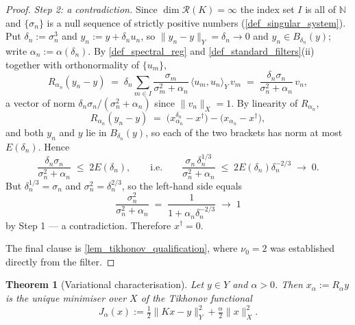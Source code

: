 \documentclass[a4paper]{report}
\theoremstyle{plain}
\newtheorem{theorem}{Theorem}[chapter]
\theoremstyle{definition}
\theoremstyle{remark}
\newcommand{\Ran}{\mathcal{R}}
\newcommand{\dg}{^{\dagger}}
\begin{document}
\begin{proof}
  \emph{Step 2: a contradiction.}  Since $\dim\Ran(K) = \infty$ the index set $I$ is all
  of $\mathbb{N}$ and $\{\sigma_n\}$ is a null sequence of strictly positive numbers
  (\cref{def_singular_system}).  Put $\delta_n := \sigma_n^{3}$ and $y_n := y +
  \delta_n u_n$, so $\|y_n - y\|_Y = \delta_n \to 0$ and $y_n \in B_{\delta_n}(y)$; write
  $\alpha_n := \alpha(\delta_n)$.  By \cref{def_spectral_reg} and
  \cref{def_standard_filters}(ii) together with orthonormality of $\{u_m\}$,
  \[
    R_{\alpha_n}(y_n - y) \;=\; \delta_n \sum_{m \in I}
      \frac{\sigma_m}{\sigma_m^{2} + \alpha_n}\,\langle u_m, u_n\rangle_Y\,v_m
      \;=\; \frac{\delta_n\sigma_n}{\sigma_n^{2} + \alpha_n}\,v_n ,
  \]
  a vector of norm $\delta_n\sigma_n/(\sigma_n^{2}+\alpha_n)$ since $\|v_n\|_X = 1$.  By
  linearity of $R_{\alpha_n}$,
  \[
    R_{\alpha_n}(y_n - y) \;=\; \bigl(x^{\delta_n}_{\alpha_n} - x\dg\bigr)
      - \bigl(x_{\alpha_n} - x\dg\bigr) ,
  \]
  and both $y_n$ and $y$ lie in $B_{\delta_n}(y)$, so each of the two brackets has norm
  at most $E(\delta_n)$.  Hence
  \[
    \frac{\delta_n\sigma_n}{\sigma_n^{2} + \alpha_n} \;\le\; 2E(\delta_n) ,
    \qquad\text{i.e.}\qquad
    \frac{\sigma_n\,\delta_n^{1/3}}{\sigma_n^{2} + \alpha_n}
      \;\le\; 2E(\delta_n)\delta_n^{-2/3} \;\longrightarrow\; 0 .
  \]
  But $\delta_n^{1/3} = \sigma_n$ and $\sigma_n^{2} = \delta_n^{2/3}$, so the left-hand
  side equals
  \[
    \frac{\sigma_n^{2}}{\sigma_n^{2}+\alpha_n}
      \;=\; \frac{1}{1 + \alpha_n\delta_n^{-2/3}} \;\longrightarrow\; 1
  \]
  by Step 1 --- a contradiction.  Therefore $x\dg = 0$.

  The final clause is \cref{lem_tikhonov_qualification}, where $\nu_0 = 2$ was
  established directly from the filter.
\end{proof}


\begin{theorem}[Variational characterisation]
  \label{thm_tikhonov_variational}
  Let $y \in Y$ and $\alpha > 0$.  Then $x_{\alpha} := R_{\alpha}y$ is the unique
  minimiser over $X$ of the \emph{Tikhonov functional}
  \[
    J_{\alpha}(x) := \tfrac12\|Kx - y\|_Y^{2} + \tfrac{\alpha}{2}\|x\|_X^{2} .
  \]
\end{theorem}
\end{document}
